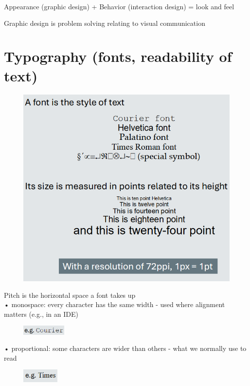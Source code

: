 \documentclass[]{project_plan}
\begin{document}
Appearance (graphic design) + Behavior (interaction design) = look and feel

Graphic design is problem solving relating to visual communication

\section{Typography (fonts, readability of text)}

\begin{figure}[h!]
  \centering
  \includegraphics[width=\linewidth]{fonts.png}
\end{figure}

\newpage

Pitch is the horizontal space a font takes up\\
• monospace: every character has the same width - used where alignment matters (e.g., in an IDE)
\begin{figure}[h!]
  \includegraphics[width=6em]{courier_font.png}
\end{figure}

• proportional: some characters are wider than others - what we normally use to read
\begin{figure}[h!]
  \includegraphics[width=5em]{times_font.png}
\end{figure}
\end{document}
